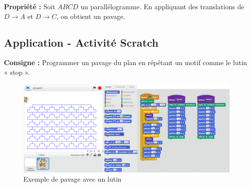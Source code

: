 \documentclass[12pt]{article}
\begin{document}
    \textbf{Propriété :} Soit \( ABCD \) un parallélogramme. En appliquant des translations de \( D \rightarrow A \) et \( D \rightarrow C \), on obtient un pavage.

    \subsection{Application - Activité Scratch}

    \textbf{Consigne :} Programmer un pavage du plan en répétant un motif comme le lutin « stop ».

    \begin{figure}[h!]
        \centering
        \includegraphics[width=1.2\textwidth]{scratch_pavage.png}
        \caption{Exemple de pavage avec un lutin}
    \end{figure}
\end{document}
